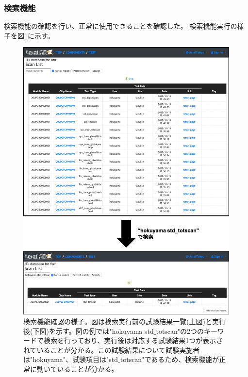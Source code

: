 \clearpage
\subsubsection{検索機能}

検索機能の確認を行い、正常に使用できることを確認した。
検索機能実行の様子を図\ref{demo_search_function}に示す。

\begin{figure}[bpt]\centering
\includegraphics[width=13cm]{./demo_search_function.png}
\caption[検索機能確認の様子]{検索機能確認の様子。図は検索実行前の試験結果一覧(上図)と実行後(下図)を示す。図の例では"hokuyama std$\_$totscan"の2つのキーワードで検索を行っており、実行後は対応する試験結果1つが表示されていることが分かる。この試験結果について試験実施者は"hokuyama"、試験項目は"std$\_$totscan"であるため、検索機能が正常に動いていることが分かる。}
\label{demo_search_function}
\end{figure}

